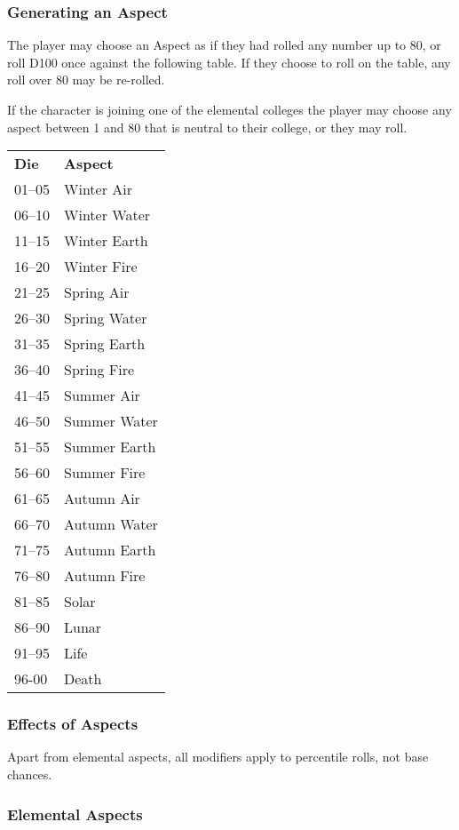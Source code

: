 \begin{multicols*}{3}
\subsubsection{Generating an Aspect}

The player may choose an Aspect as if they had rolled any number up to
80, or roll D100 once against the following table. If they choose to
roll on the table, any roll over 80 may be re-rolled.

If the character is joining one of the elemental colleges the player
may choose any aspect between 1 and 80 that is neutral to their
college, or they may roll.


\begin{tabular}{ll}
\textbf{Die} & \textbf{Aspect} \\
01--05		& Winter Air \\
06--10		& Winter Water \\
11--15		& Winter Earth \\
16--20		& Winter Fire \\
21--25		& Spring Air \\
26--30		& Spring Water \\
31--35		& Spring Earth \\
36--40		& Spring Fire \\
41--45		& Summer Air \\
46--50		& Summer Water \\
51--55		& Summer Earth \\
56--60		& Summer Fire \\
61--65		& Autumn Air \\
66--70		& Autumn Water \\
71--75		& Autumn Earth \\
76--80		& Autumn Fire \\
81--85		& Solar \\
86--90		& Lunar \\
91--95		& Life \\
96-00		& Death \\
\end{tabular}

\subsubsection{Effects of Aspects}

Apart from elemental aspects, all modifiers apply to percentile rolls,
not base chances.

\subsubsection{Elemental Aspects}


\end{multicols*}
